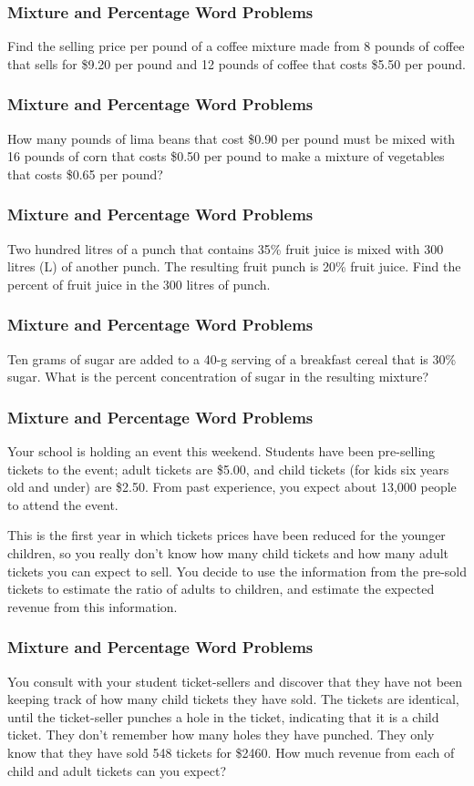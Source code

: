 \documentclass[xcolor=dvipsnames]{beamer}
\begin{document}
\begin{frame}
  \frametitle{Mixture and Percentage Word Problems}
  {\ubung} Find the selling price per pound of a coffee mixture made
  from 8 pounds of coffee that sells for \$9.20 per pound and 12
  pounds of coffee that costs \$5.50 per pound.
\end{frame}

\begin{frame}
  \frametitle{Mixture and Percentage Word Problems}
  {\ubung} How many pounds of lima beans that cost \$0.90 per pound
  must be mixed with 16 pounds of corn that costs \$0.50 per pound to
  make a mixture of vegetables that costs \$0.65 per pound?
\end{frame}

\begin{frame}
  \frametitle{Mixture and Percentage Word Problems}
  {\ubung} Two hundred litres of a punch that contains 35\% fruit
  juice is mixed with 300 litres (L) of another punch. The resulting
  fruit punch is 20\% fruit juice. Find the percent of fruit juice in
  the 300 litres of punch.
\end{frame}

\begin{frame}
  \frametitle{Mixture and Percentage Word Problems}
  {\ubung} Ten grams of sugar are added to a 40-g serving of a
  breakfast cereal that is 30\% sugar. What is the percent
  concentration of sugar in the resulting mixture?
\end{frame}

\begin{frame}
  \frametitle{Mixture and Percentage Word Problems}
  {\ubung} Your school is holding an event this weekend. Students have
  been pre-selling tickets to the event; adult tickets are \$5.00, and
  child tickets (for kids six years old and under) are \$2.50. From
  past experience, you expect about 13,000 people to attend the event.

\medskip

  This is the first year in which tickets prices have been reduced for
  the younger children, so you really don't know how many child
  tickets and how many adult tickets you can expect to sell. You
  decide to use the information from the pre-sold tickets to estimate
  the ratio of adults to children, and estimate the expected revenue
  from this information.
\end{frame}

\begin{frame}
  \frametitle{Mixture and Percentage Word Problems}
  You consult with your student ticket-sellers and discover that they
  have not been keeping track of how many child tickets they have
  sold. The tickets are identical, until the ticket-seller punches a
  hole in the ticket, indicating that it is a child ticket. They don't
  remember how many holes they have punched. They only know that they
  have sold 548 tickets for \$2460. How much revenue from each of
  child and adult tickets can you expect?
\end{frame}
\end{document}
